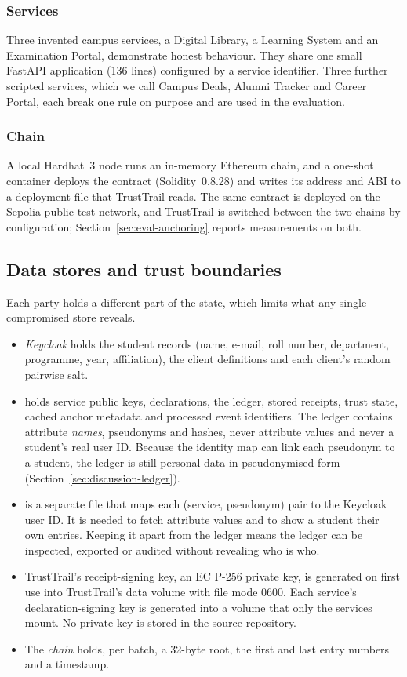 \subsubsection{Services}
Three invented campus services, a Digital Library, a Learning System and an Examination Portal, demonstrate honest behaviour. They share one small FastAPI application (136 lines) configured by a service identifier. Three further scripted services, which we call Campus Deals, Alumni Tracker and Career Portal, each break one rule on purpose and are used in the evaluation.

\subsubsection{Chain}
A local Hardhat~3 node runs an in-memory Ethereum chain, and a one-shot container deploys the  contract (Solidity~0.8.28) and writes its address and ABI to a deployment file that TrustTrail reads. The same contract is deployed on the Sepolia public test network, and TrustTrail is switched between the two chains by configuration; Section~\ref{sec:eval-anchoring} reports measurements on both.

\subsection{Data stores and trust boundaries}
Each party holds a different part of the state, which limits what any single compromised store reveals.
\begin{itemize}
\item \emph{Keycloak} holds the student records (name, e-mail, roll number, department, programme, year, affiliation), the client definitions and each client's random pairwise salt.
\item \emph{} holds service public keys, declarations, the ledger, stored receipts, trust state, cached anchor metadata and processed event identifiers. The ledger contains attribute \emph{names}, pseudonyms and hashes, never attribute values and never a student's real user ID. Because the identity map can link each pseudonym to a student, the ledger is still personal data in pseudonymised form (Section~\ref{sec:discussion-ledger}).
\item \emph{} is a separate file that maps each (service, pseudonym) pair to the Keycloak user ID. It is needed to fetch attribute values and to show a student their own entries. Keeping it apart from the ledger means the ledger can be inspected, exported or audited without revealing who is who.
\item TrustTrail's receipt-signing key, an EC P-256 private key, is generated on first use into TrustTrail's data volume with file mode 0600. Each service's declaration-signing key is generated into a volume that only the services mount. No private key is stored in the source repository.
\item The \emph{chain} holds, per batch, a 32-byte root, the first and last entry numbers and a timestamp.
\end{itemize}

